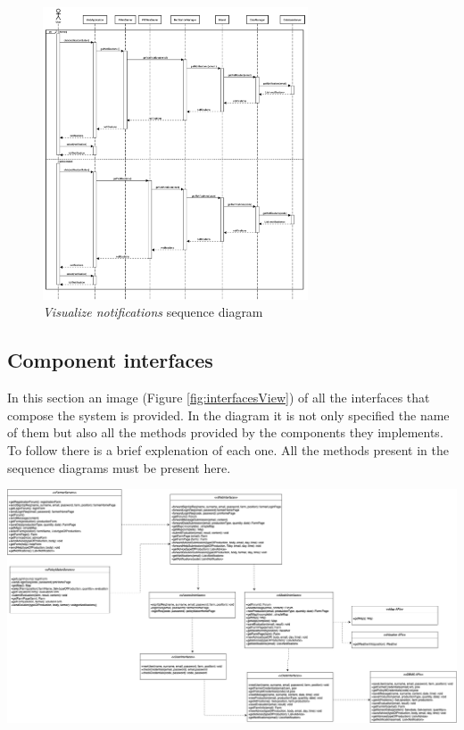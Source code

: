 \begin{enumerate}
\begin{figure}[H]
\begin{center}
        \includegraphics[width=0.7\textwidth]{sequence/viewNotifications.png}
        \caption{\emph{Visualize notifications} sequence diagram}
        \label{fig:sequence9}
        \end{center}
    \end{figure}
    
\end{enumerate}


\subsection{Component interfaces}
In this section an image (Figure \ref{fig:interfacesView}) of all the interfaces that compose the system is provided. In the diagram it is not only specified the name of them but also all the methods provided by the components they implements. To follow there is a brief explenation of each one. All the methods present in the sequence diagrams must be present here. 

\begin{adjustbox}{angle=90,center,caption=\emph{Interfaces} view,nofloat=figure}
    \includegraphics[width=1.6\linewidth]{images/Interfaces.png}
    \label{fig:interfacesView}
\end{adjustbox}

